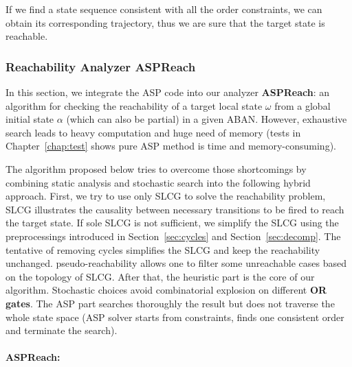 If we find a state sequence consistent with all the order constraints, we can obtain its corresponding trajectory, thus we are sure that the target state is reachable.
\subsubsection{Reachability Analyzer ASPReach}
In this section, we integrate the ASP code into our analyzer \textbf{ASPReach}: an algorithm for checking the reachability of a target local state $\omega$ from a global initial state $\alpha$ (which can also be partial) in a given ABAN.
However, exhaustive search leads to heavy computation and huge need of memory (tests in Chapter~\ref{chap:test} shows pure ASP method is time and memory-consuming).

The algorithm proposed below tries to overcome those shortcomings by combining static analysis and stochastic search into the following hybrid approach.
First, we try to use only SLCG to solve the reachability problem, SLCG illustrates the causality between necessary transitions to be fired to reach the target state.
If sole SLCG is not sufficient, we simplify the SLCG using the preprocessings introduced in Section~\ref{sec:cycles} and Section~\ref{sec:decomp}. 
The tentative of removing cycles simplifies the SLCG and keep the reachability unchanged. 
pseudo-reachability allows one to filter some unreachable cases based on the topology of SLCG. 
After that, the heuristic part is the core of our algorithm.
Stochastic choices avoid combinatorial explosion on different \textbf{OR gates}.
The ASP part searches thoroughly the result but does not traverse the whole state space (ASP solver starts from constraints, finds one consistent order and terminate the search). 

\paragraph{{\bf ASPReach}:}

